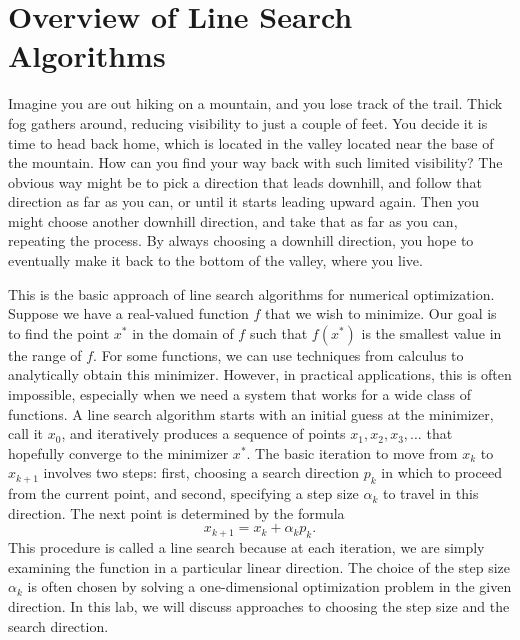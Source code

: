 
\section*{Overview of Line Search Algorithms}
Imagine you are out hiking on a mountain, and you lose track of the trail. Thick fog
gathers around, reducing visibility to just a couple of feet. You decide it is time
to head back home, which is located in the valley located near the base of the mountain.
How can you find your way back with such limited visibility? The obvious way might be to
pick a direction that leads downhill, and follow that direction as far as you can, or
until it starts leading upward again. Then you might choose another downhill direction,
and take that as far as you can, repeating the process. By always choosing a downhill
direction, you hope to eventually make it back to the bottom of the valley, where you live.

This is the basic approach of line search algorithms for numerical optimization.
Suppose we have a real-valued function $f$ that we wish to minimize. Our goal is to find the
point $x^*$ in the domain of $f$ such that $f(x^*)$ is the smallest value in the range of
$f$. For some functions, we can use techniques from calculus to analytically obtain this
minimizer. However, in practical applications, this is often impossible, especially when
we need a system that works for a wide class of functions. A line search algorithm starts with
an initial guess at the minimizer, call it $x_0$, and iteratively produces a sequence of
points $x_1, x_2, x_3, \ldots$ that hopefully converge to the minimizer $x^*$. The basic
iteration to move from $x_k$ to $x_{k+1}$ involves two steps: first, choosing a search direction $p_k$
in which to proceed from the current point, and second, specifying a step size $\alpha_k$ to travel
in this direction. The next point is determined by the formula
$$
x_{k+1} = x_k + \alpha_kp_k.
$$
This procedure is called a line search because at each iteration, we are simply examining the
function in a particular linear direction. The choice of the step size $\alpha_k$ is often
chosen by solving a one-dimensional optimization problem in the given direction. In this lab,
we will discuss approaches to choosing the step size and the search direction.

